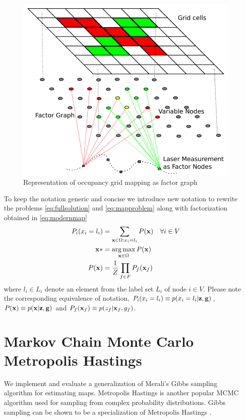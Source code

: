 \documentclass[letterpaper, 10 pt, conference]{ieeeconf} %
\DeclareMathOperator*{\argmax}{arg\,max}
\begin{document}
\begin{figure}
  \includegraphics[width=\columnwidth]{../figures/factorgraph/factorgraph.pdf}
  \caption{Representation of occupancy grid mapping as factor graph}
  \label{fig:factor-graph}
\end{figure}

To keep the notation generic and concise we introduce new notation
to rewrite the problems \eqref{eq:fullsolution} and \eqref{eq:mapproblem}
along with factorization obtained in \eqref{eq:modernmap}
\begin{align}
  P_i(x_i = l_i) &= \sum_{\map \in \Omega : x_i = l_i} P(\map) & \forall i \in V
  \label{eq:marginalgeneric}
  \\
     \map* &= \argmax_{\map \in \Omega} P(\map)
  \label{eq:mapgeneric}
  \\
   P(\map) &= \frac{1}{Z}\prod_{f \in F} P_f(\map_f)
  \label{eq:factorizationgeneric}
\end{align}
where  $l_i \in L_i$ denote an element from the label set $L_i$ of node $i \in V$.
Please note the corresponding equivalence of notation, $P_i(x_i = l_i) \equiv p(x_i
= l_i|\mathbf{z}, \mathbf{g})$, $P(\mathbf{x}) \equiv p(\mathbf{x}|\mathbf{z}, \mathbf{g})$ and $P_f(\mathbf{x}_f)
\equiv
p(z_f|\mathbf{x}_f, g_f)$.

\section{Markov Chain Monte Carlo Metropolis Hastings}
We implement and evaluate a generalization of Merali's \cite{merali2013icra}
Gibbs sampling algorithm for estimating maps.  Metropolis Hastings is another
popular MCMC algorithm used for sampling from complex probability 
distributions. Gibbs sampling can be shown to be a specialization of Metropolis
Hastings \cite{mackay1998introduction}.
\end{document}
